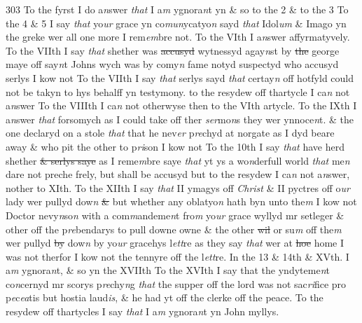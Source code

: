 \documentclass[12pt, a4paper]{book}
\begin{document}
{\color{Mahogany}303} To the fyrst I do a\textit{n}swer \textit{that} I a\textit{m} ygnora\textit{n}t yn \& so to the 2 \& to the 3 To the 4 \& 5 I say \textit{that} yo\textit{ur} grace yn co\textit{mun}ycatyo\textit{n} sayd \textit{that} Idol\textit{um} \& Imago yn the greke wer all one more I rem\textit{em}bre not. To the VIth I a\textit{n}swer affyrmatyvely.  To the VIIth I say \textit{that} shether was \sout{accusyd }wytnessyd agay\textit{n}st by \sout{the } george maye off say\textit{n}t Johns wych was by comy\textit{n} fame notyd suspectyd who accusyd serlys I kow not To the VIIth I say \textit{that} serlys sayd \textit{that} certay\textit{n} off hotfyld could not be takyn to hys behalff yn testymony. to the resydew off thartycle I ca\textit{n}  not a\textit{n}swer To the VIIIth I ca\textit{n} not otherwyse then to the VIth artycle. To the IXth I a\textit{n}swer \textit{that} forsomych as I could take off ther \textit{ser}mo\textit{n}s they wer ynnoce\textit{n}t. \& the one declaryd on a stole \textit{that} that he  nev\textit{er} p\textit{re}chyd at norgate as I dyd beare away \& who pit the  other to p\textit{ri}son I kow not To the 10th I say \textit{that} have herd shether \sout{\& serlys saye}
               as I reme\textit{m}bre
			 saye \textit{that} yt ys a wo\textit{n}derfull world \textit{that }me\textit{n} dare not preche frely, but shall be accusyd but to the resydew I ca\textit{n} not a\textit{n}swer, nother to XIth. To the XIIth I say \textit{that} II ymagys off \textit{Christ} \& II pyctres off o\textit{ur} lady wer pullyd dow\textit{n}
               \sout{\&} but whether any oblatyo\textit{n} hath byn unto the\textit{m} I kow not Doctor nevy\textit{n}so\textit{n} with a com\textit{m}andeme\textit{n}t fro\textit{m} yo\textit{ur} grace wyllyd mr setleger \& other off the p\textit{re}bendarys to pull downe owne \& the other \sout{wil }or su\textit{m} off the\textit{m}
			wer pullyd \sout{by }dow\textit{n} by yo\textit{ur} gracehys l\textit{ett}re as they say \textit{that} wer at \sout{hoe} home I was not therfor I kow not the tennyre off the l\textit{ett}re. In the 13 \& 14th \& XVth. I a\textit{m} ygnora\textit{n}t, \& so yn the XVIIth To the XVIth I say that the yndyteme\textit{n}t co\textit{n}cernyd mr scorys p\textit{re}chy\textit{n}g \textit{that} the supper off the lord was not sac\textit{ri}fice pro p\textit{e}c\textit{ea}tis but hostia laud\textit{is}, \& he had yt off the clerke off the peace.  To the resydew off thartycles I say \textit{that} I a\textit{m} ygnora\textit{n}t yn  John myllys.  
\end{document}
